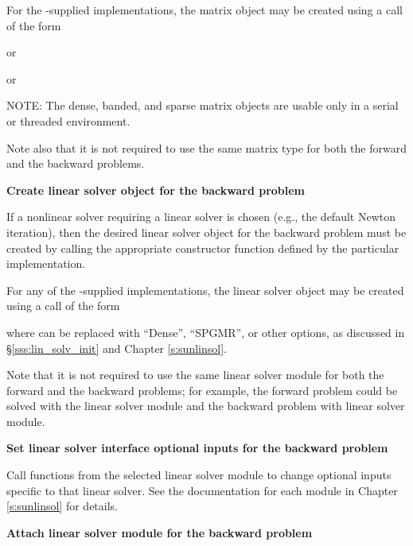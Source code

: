 \begin{Steps}
  For the {\sundials}-supplied {\sunmatrix} implementations, the
  matrix object may be created using a call of the form


   or


   or


  NOTE: The dense, banded, and sparse matrix objects are usable only in a
  serial or threaded environment.

  Note also that it is not required to use the same matrix type for both the forward
  and the backward problems.

\item \label{i:lin_solverB}
  {\bf Create linear solver object for the backward problem}

  If a nonlinear solver requiring a linear solver is chosen (e.g., the default
  Newton iteration), then the desired linear solver object for the backward
  problem must be created by calling the appropriate constructor function
  defined by the particular {\sunlinsol} implementation.

  For any of the {\sundials}-supplied {\sunlinsol} implementations,
  the linear solver object may be created using a call of the form


  where \id{*} can be replaced with ``Dense'', ``SPGMR'', or other
  options, as discussed in \S\ref{sss:lin_solv_init} and Chapter {\ref{s:sunlinsol}}.

  Note that it is not required to use the same linear solver module for both the forward
  and the backward problems; for example, the forward problem could be solved
  with the {\sunlinsoldense} linear solver module and the backward problem with
  {\sunlinsolspgmr} linear solver module.

\item
  {\bf Set linear solver interface optional inputs for the backward problem}

  Call  functions from the selected linear solver module to
  change optional inputs specific to that linear solver.
  See the documentation for each {\sunlinsol} module in Chapter
  {\ref{s:sunlinsol}} for details.

\item\label{i:lin_solver_interfaceB}
  {\bf Attach linear solver module for the backward problem}


\end{Steps}
